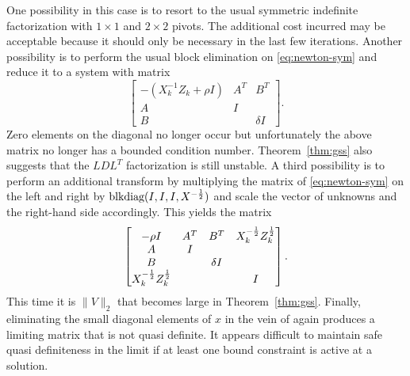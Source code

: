 \documentclass{amsart}
\begin{document}
One possibility in this case is to resort to the usual symmetric indefinite
factorization with $1 \times 1$ and $2 \times 2$ pivots. The additional cost
incurred may be acceptable because it should only be necessary in the last few
iterations. Another possibility is to perform the usual block elimination on
\eqref{eq:newton-sym} and reduce it to a system with  matrix
\[
  \begin{bmatrix}
    - (X_k^{-1} Z_k + \rho I) & A^T & B^T \\
      A                       & I   &     \\
      B                       &     & \delta I
  \end{bmatrix}.
\]
Zero elements on the diagonal no longer occur but unfortunately the above
matrix no longer has a bounded condition number. Theorem~\ref{thm:gss} also
suggests that the $LDL^T$ factorization is still unstable. A third possibility
is to perform an additional transform by multiplying the  matrix of
\eqref{eq:newton-sym} on the left and right by $\mathop{\text{blkdiag}}(I, I, I, X^{-\frac12})$
and scale the vector of unknowns and the right-hand side accordingly. This
yields the  matrix
\[
  \begin{bmatrix}
    -\rho I                     & A^T & B^T      & X_k^{-\frac12} Z_k^{\frac12} \\
     A                          & I   &          &               \\
     B                          &     & \delta I &               \\
     X_k^{-\frac12} Z_k^{\frac12} &     &          &  I
  \end{bmatrix}.
\]
This time it is $\|V\|_2$ that becomes large in Theorem~\ref{thm:gss}. Finally,
eliminating the small diagonal elements of $x$ in the vein of \cite{gould-1986}
again produces a limiting matrix that is not quasi definite. It appears
difficult to maintain safe quasi definiteness in the limit if at least one
bound constraint is active at a solution.
\end{document}

